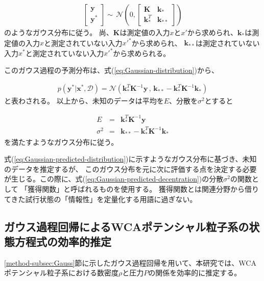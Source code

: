\documentclass[titlepage]{jsreport}
\begin{document}
{{{\large
\begin{eqnarray}
    \left[
        \begin{array}{l}
            \bm{y} \\
            \bm{y}^* 
        \end{array}
    \right]
    {\sim}\,{\mathcal{N}}
    \left(0,
        \left[
            \begin{array}{cc}
                \bm{K} & \bm{k}_*\\    
                \bm{k}_*^T & \bm{k}_{**}
            \end{array}
        \right]
    \right) \label{eq:Gaussian-distribution}
\end{eqnarray}
\normalsize
のようなガウス分布に従う。
尚、$\bm{K}$は測定値の入力$x$と$x'$から求められ、$\bm{k}_*$は測定値の入力$x$と測定されていない入力$x'^*$から求められ、
$\bm{k}_{**}$は測定されていない入力$x^*$と測定されていない入力$x'^*$から求められる。

このガウス過程の予測分布は、式(\ref{eq:Gaussian-distribution})から、

\large
\begin{eqnarray}
p(\bm{y}^*|\bm{x}^*,\mathcal{D})
={\mathcal{N}}(\bm{k}_*^T\bm{K}^{-1}\bm{y}\,,\,\bm{k}_{**}-\bm{k}_*^T\bm{K}^{-1}\bm{k}_*)  \label{eq:Gaussian-predicted-distribution}
\end{eqnarray}
\normalsize
と表わされる。
以上から、未知のデータは平均を$E$、分散を$\sigma^2$とすると

\large
\begin{eqnarray}
    E&=&\bm{k}_*^T\bm{K}^{-1}\bm{y}\\ \label{eq:Gaussian-predicted-average}
    \sigma^2&=&\bm{k}_{**}-\bm{k}_*^T\bm{K}^{-1}\bm{k}_* \label{eq:Gaussian-predicted-decentration}
\end{eqnarray}
\normalsize
を満たすようなガウス分布に従う\cite{Gauss-machine-learning}。

式(\ref{eq:Gaussian-predicted-distribution})に示すようなガウス分布に基づき、未知のデータを推定するが、
このガウス分布を元に次に評価する点を決定する必要が生じる。この際に、式(\ref{eq:Gaussian-predicted-decentration})の分散$\sigma^2$の関数として
「獲得関数」と呼ばれるものを使用する。
獲得関数とは関連分野から借りてきた試行状態の「情報性」を定量化する用語に過ぎない\cite{acquisition-function}。


\subsection{ガウス過程回帰によるWCAポテンシャル粒子系の状態方程式の効率的推定}\label{method-subsec:Gaussian-estimation}
\ref{method-subsec:Gauss}節に示したガウス過程回帰を用いて、本研究では、WCAポテンシャル粒子系における数密度$\rho$と圧力$P$の関係を効率的に推定する。

}}}
\end{document}
